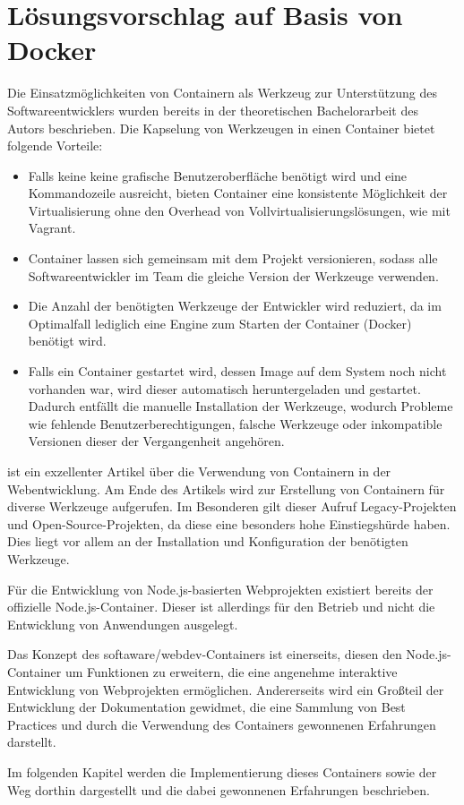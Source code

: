 \chapter{Lösungsvorschlag auf Basis von Docker}
\label{cha:concept}
Die Einsatzmöglichkeiten von Containern als Werkzeug zur Unterstützung des Softwareentwicklers wurden bereits in der theoretischen Bachelorarbeit des Autors beschrieben.
Die Kapselung von Werkzeugen in einen Container bietet folgende Vorteile:

\begin{itemize}
    \item Falls keine keine grafische Benutzeroberfläche benötigt wird und eine Kommandozeile ausreicht, bieten Container eine konsistente Möglichkeit der Virtualisierung ohne den Overhead von Vollvirtualisierungslösungen, wie \zB mit Vagrant.
    \item Container lassen sich gemeinsam mit dem Projekt versionieren, sodass alle Softwareentwickler im Team die gleiche Version der Werkzeuge verwenden.
    \item Die Anzahl der benötigten Werkzeuge der Entwickler wird reduziert, da im Optimalfall lediglich eine Engine zum Starten der Container (\zB Docker) benötigt wird.
    \item Falls ein Container gestartet wird, dessen Image auf dem System noch nicht vorhanden war, wird dieser automatisch heruntergeladen und gestartet.
        Dadurch entfällt die manuelle Installation der Werkzeuge, wodurch Probleme wie fehlende Benutzerberechtigungen, falsche Werkzeuge oder inkompatible Versionen dieser der Vergangenheit angehören.
\end{itemize}
\autocite{Demmel.webdev-environment:online} ist ein exzellenter Artikel über die Verwendung von Containern in der Web\-ent\-wick\-lung.
Am Ende des Artikels wird zur Erstellung von Containern für diverse Werkzeuge aufgerufen.
Im Besonderen gilt dieser Aufruf Legacy-Projekten und Open-Source-Projekten, da diese eine besonders hohe Einstiegshürde haben.
Dies liegt vor allem an der Installation und Konfiguration der benötigten Werkzeuge.


Für die Entwicklung von Node.js-basierten Webprojekten existiert bereits der offizielle Node.js-Container.
Dieser ist allerdings für den Betrieb und nicht die Entwicklung von Anwendungen ausgelegt.

Das Konzept des softaware/webdev-Containers ist einerseits, diesen den Node.js-Container um Funktionen zu erweitern, die eine angenehme interaktive Entwicklung von Webprojekten ermöglichen.
Andererseits wird ein Großteil der Entwicklung der Dokumentation gewidmet, die eine Sammlung von Best Practices und durch die Verwendung des Containers gewonnenen Erfahrungen darstellt.

Im folgenden Kapitel werden die Implementierung dieses Containers sowie der Weg dorthin dargestellt und die dabei gewonnenen Erfahrungen beschrieben.
